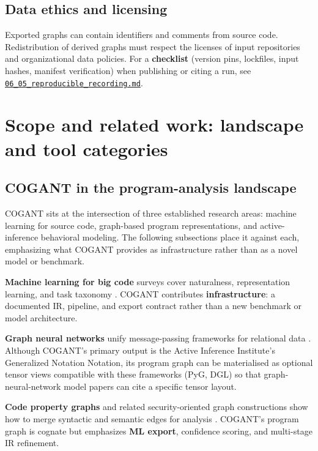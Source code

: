 \documentclass[
]{article}
\begin{document}
\subsection{Data ethics and licensing}\label{data-ethics-and-licensing}

Exported graphs can contain identifiers and comments from source code.
Redistribution of derived graphs must respect the licenses of input
repositories and organizational data policies. For a \textbf{checklist}
(version pins, lockfiles, input hashes, manifest verification) when
publishing or citing a run, see
\href{06_05_reproducible_recording.md}{\texttt{06\_05\_reproducible\_recording.md}}.

\newpage

\section{Scope and related work: landscape and tool
categories}\label{scope-and-related-work-landscape-and-tool-categories}

\subsection{COGANT in the program-analysis
landscape}\label{cogant-in-the-program-analysis-landscape}

COGANT sits at the intersection of three established research areas:
machine learning for source code, graph-based program representations,
and active-inference behavioral modeling. The following subsections
place it against each, emphasizing what COGANT provides as
infrastructure rather than as a novel model or benchmark.

\textbf{Machine learning for big code} surveys cover naturalness,
representation learning, and task taxonomy \citep{allamanis2018survey}.
COGANT contributes \textbf{infrastructure}: a documented IR, pipeline,
and export contract rather than a new benchmark or model architecture.

\textbf{Graph neural networks} unify message-passing frameworks for
relational data \citep{wu2020comprehensive, scarselli2009graph}.
Although COGANT's primary output is the Active Inference Institute's
Generalized Notation Notation, its program graph can be materialised as
optional tensor views compatible with these frameworks (PyG, DGL) so
that graph-neural-network model papers can cite a specific tensor
layout.

\textbf{Code property graphs} and related security-oriented graph
constructions show how to merge syntactic and semantic edges for
analysis \citep{yamaguchi2014modeling}. COGANT's program graph is
cognate but emphasizes \textbf{ML export}, confidence scoring, and
multi-stage IR refinement.
\end{document}
